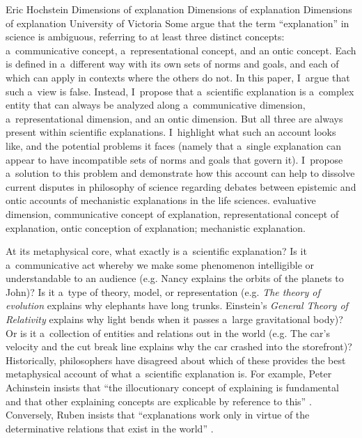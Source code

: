 \begin{artengenv}{Eric Hochstein}
	{Dimensions of explanation}
	{Dimensions of explanation}
	{Dimensions of explanation}
	{University of Victoria}
	{Some argue that the term ``explanation'' in science is ambiguous, referring to at least three distinct concepts: a~communicative concept, a~representational concept, and an ontic concept. Each is defined in a~different way with its own sets of norms and goals, and each of which can apply in contexts where the others do not. In this paper, I~argue that such a~view is false. Instead, I~propose that a~scientific explanation is a~complex entity that can always be analyzed along a~communicative dimension, a~representational dimension, and an ontic dimension. But all three are always present within scientific explanations. I~highlight what such an account looks like, and the potential problems it faces (namely that a~single explanation can appear to have incompatible sets of norms and goals that govern it). I~propose a~solution to this problem and demonstrate how this account can help to dissolve current disputes in philosophy of science regarding debates between epistemic and ontic accounts of mechanistic explanations in the life sciences.
	}
	{evaluative dimension, communicative concept of explanation, representational concept of explanation, ontic conception of explanation; mechanistic explanation.}




\lettrine[loversize=0.13,lines=2,lraise=-0.03,nindent=0em,findent=0.2pt]%
{A}{}t its metaphysical core, what exactly is a~scientific explanation? Is it a~communicative act whereby we make some phenomenon intelligible or understandable to an audience (e.g. Nancy explains the orbits of the planets to John)? Is it a~type of theory, model, or representation (e.g. \textit{The theory of evolution} explains why elephants have long trunks. Einstein's \textit{General Theory of} \textit{Relativity} explains why light bends when it passes a~large gravitational body)? Or is it a~collection of entities and relations out in the world (e.g. The car's velocity and the cut break line explains why the car crashed into the storefront)? Historically, philosophers have disagreed about which of these provides the best metaphysical account of what a~scientific explanation is. For example, Peter Achinstein insists that ``the illocutionary concept of explaining is fundamental and that other explaining concepts are explicable by reference to this''
\parencite*[][p.22]{achinstein_pragmatic_1984}. %
 Conversely, Ruben insists that ``explanations work only in virtue of the determinative relations that exist in the world'' 
\parencite[][p.231]{ruben_explaining_1990}.%



\end{artengenv}
